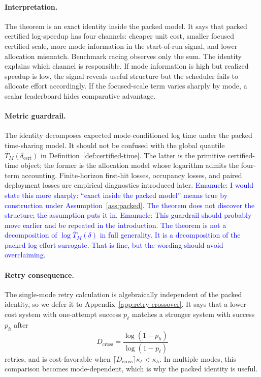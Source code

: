 \documentclass{article}
\begin{document}
\paragraph{Interpretation.}
The theorem is an exact identity inside the packed model.  It says that packed certified
log-speedup has four channels: cheaper unit cost, smaller focused certified scale, more
mode information in the start-of-run signal, and lower allocation mismatch.  Benchmark
racing observes only the sum.  The identity explains which channel is responsible.  If mode
information is high but realized speedup is low, the signal reveals useful structure but the
scheduler fails to allocate effort accordingly.  If the focused-scale term varies sharply by
mode, a scalar leaderboard hides comparative advantage.

\paragraph{Metric guardrail.}
The identity decomposes expected mode-conditioned log time under the packed time-sharing
model.  It should not be confused with the global quantile
\(\overline T_M(\delta_{\mathrm{cert}})\) in Definition~\ref{def:certified-time}.  The latter is the
primitive certified-time object; the former is the allocation model whose logarithm admits
the four-term accounting.  Finite-horizon first-hit losses, occupancy losses, and paired
deployment losses are empirical diagnostics introduced later.
\textcolor{blue}{Emanuele: I would state this more sharply: ``exact inside the packed model'' means true by construction under Assumption~\ref{ass:packed}. The theorem does not discover the structure; the assumption puts it in.}
\textcolor{blue}{Emanuele: This guardrail should probably move earlier and be repeated in the introduction. The theorem is not a decomposition of \(\log\overline T_M(\delta)\) in full generality. It is a decomposition of the packed log-effort surrogate. That is fine, but the wording should avoid overclaiming.}


\paragraph{Retry consequence.}
The single-mode retry calculation is algebraically independent of the packed identity, so we defer it to Appendix~\ref{app:retry-crossover}.  It says that a lower-cost system with one-attempt success \(p_\ell\) matches a stronger system with success \(p_h\) after
\[
    D_{\mathrm{cross}}=\frac{\log(1-p_h)}{\log(1-p_\ell)}
\]
retries, and is cost-favorable when \(\lceil D_{\mathrm{cross}}\rceil\kappa_\ell<\kappa_h\).  In multiple modes, this comparison becomes mode-dependent, which is why the packed identity is useful.
\end{document}
